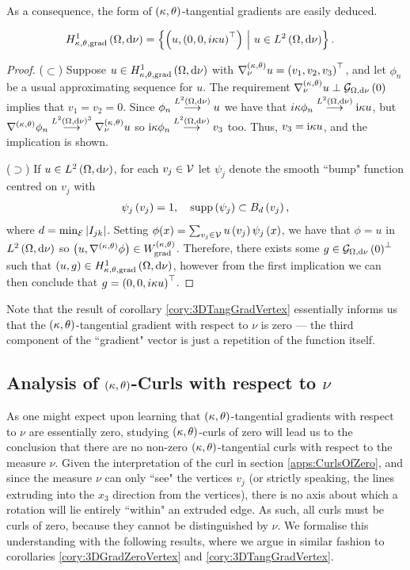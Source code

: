 As a consequence, the form of $\left( \kappa, \theta \right)$-tangential gradients are easily deduced.
\begin{cory} \label{cory:3DTangGradVertex}
	\begin{align*}
		H^1_{\kappa,\theta,\mathrm{grad}}\left( \Omega, \mathrm{d}\nu \right) &=
		 \left\{  \left(  u, \left( 0,0, i\kappa u \right)^\top \right) \ \middle\vert \  u\in L^{2}\left( \Omega,\mathrm{d}\nu \right)  \right\}.
	\end{align*}
\end{cory}
\begin{proof}
	($\subset$) Suppose $u\in H^1_{\kappa,\theta,\mathrm{grad}}\left( \Omega, \mathrm{d}\nu \right)$ with $\nabla^{\left( \kappa, \theta \right)}_{\nu}u=\left( v_1,v_2,v_3 \right)^\top$, and let $\phi_n$ be a usual approximating sequence for $u$.
	The requirement $\nabla^{\left( \kappa, \theta \right)}_{\nu}u \perp \mathcal{G}_{ \Omega, \mathrm{d}\nu}\left( 0 \right)$ implies that $v_1 = v_2 = 0$.
	Since $\phi_n\overset{L^{2}\left( \Omega,\mathrm{d}\nu \right)}{\longrightarrow}u$ we have that $i\kappa\phi_n\overset{L^{2}\left( \Omega,\mathrm{d}\nu \right)}{\longrightarrow} \mathrm{i}\kappa u$, but $\nabla^{\left( \kappa, \theta \right)}\phi_n\overset{L^{2}\left( \Omega,\mathrm{d}\nu \right)^3}{\longrightarrow}\nabla^{\left( \kappa, \theta \right)}_{\nu}u$ so $\mathrm{i}\kappa\phi_n\overset{L^{2}\left( \Omega,\mathrm{d}\nu \right)}{\longrightarrow} v_3$ too.
	Thus, $v_3 = \mathrm{i}\kappa u$, and the implication is shown.

	($\supset$) If $u\in L^{2}\left( \Omega,\mathrm{d}\nu \right)$, for each $v_j\in\mathcal{V}$ let $\psi_j$ denote the smooth ``bump" function centred on $v_j$ with
	\begin{align*}
		\psi_j\left( v_j \right) = 1, \quad
		\mathrm{supp}\left( \psi_j \right) \subset B_d\left( v_j \right),
	\end{align*}
	where $d=\min_{\mathcal{E}}\left\lvert I_{jk} \right\rvert$.
	Setting $\phi(x) = \sum_{v_j\in\mathcal{V}}u\left( v_j \right)\psi_j\left( x \right)$, we have that $\phi=u$ in $L^{2}\left( \Omega,\mathrm{d}\nu \right)$ so $\left( u,\nabla^{\left( \kappa, \theta \right)}\phi \right)\in W^{\left( \kappa, \theta \right)}_{\mathrm{grad}}$.
	Therefore, there exists some $g\in\mathcal{G}_{ \Omega, \mathrm{d}\nu}\left( 0 \right)^{\perp}$ such that $\left( u,g \right)\in H^1_{\kappa,\theta,\mathrm{grad}}\left( \Omega, \mathrm{d}\nu \right)$, however from the first implication we can then conclude that $g = \left( 0,0, i\kappa u \right)^\top$.
\end{proof}
Note that the result of corollary \ref{cory:3DTangGradVertex} essentially informs us that the $\left( \kappa, \theta \right)$-tangential gradient with respect to $\nu$ is zero --- the third component of the ``gradient" vector is just a repetition of the function itself.

\subsection{Analysis of $\left( \kappa, \theta \right)$-Curls with respect to $\nu$} \label{apps:VertexCurls}
As one might expect upon learning that $\left( \kappa, \theta \right)$-tangential gradients with respect to $\nu$ are essentially zero, studying $\left( \kappa, \theta \right)$-curls of zero will lead us to the conclusion that there are no non-zero $\left( \kappa, \theta \right)$-tangential curls with respect to the measure $\nu$.
Given the interpretation of the curl in section \ref{apps:CurlsOfZero}, and since the measure $\nu$ can only ``see" the vertices $v_j$ (or strictly speaking, the lines extruding into the $x_3$ direction from the vertices), there is no axis about which a rotation will lie entirely ``within" an extruded edge.
As such, all curls must be curls of zero, because they cannot be distinguished by $\nu$.
We formalise this understanding with the following results, where we argue in similar fashion to corollaries \ref{cory:3DGradZeroVertex} and \ref{cory:3DTangGradVertex}.

